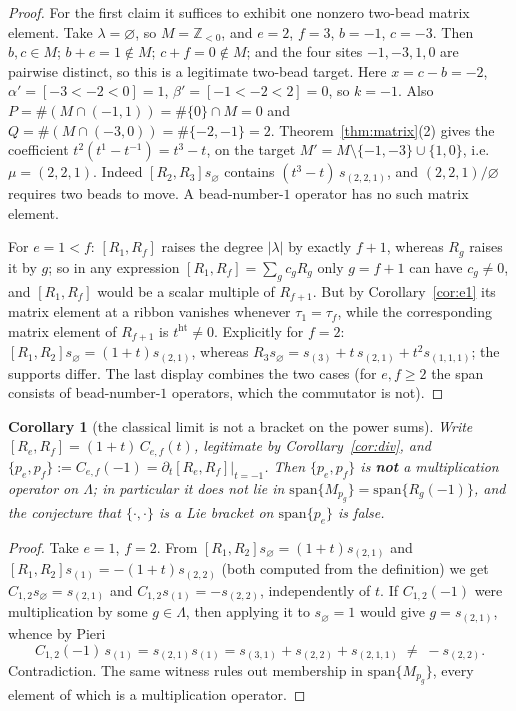 \documentclass[11pt]{article}
\newtheorem{corollary}[theorem]{Corollary}
\theoremstyle{definition}
\newcommand{\hgt}{\operatorname{ht}}          %
\newcommand{\Z}{\mathbb{Z}}
\newcommand{\Lam}{\Lambda}
\newcommand{\Mult}[1]{M_{#1}}
\begin{document}
\begin{proof}
For the first claim it suffices to exhibit one nonzero two-bead matrix element.
Take $\lambda=\varnothing$, so $M=\Z_{<0}$, and $e=2$, $f=3$, $b=-1$, $c=-3$.
Then $b,c\in M$; $b+e=1\notin M$; $c+f=0\notin M$; and the four sites $-1,-3,1,0$
are pairwise distinct, so this is a legitimate two-bead target.  Here $x=c-b=-2$,
$\alpha'=[-3<-2<0]=1$, $\beta'=[-1<-2<2]=0$, so $k=-1$.  Also
$P=\#(M\cap(-1,1))=\#\{0\}\cap M=0$ and $Q=\#(M\cap(-3,0))=\#\{-2,-1\}=2$.
Theorem~\ref{thm:matrix}(2) gives the coefficient $t^{2}(t^{1}-t^{-1})=t^{3}-t$, on the
target $M'=M\setminus\{-1,-3\}\cup\{1,0\}$, i.e.\ $\mu=(2,2,1)$.  Indeed
$[R_2,R_3]s_\varnothing$ contains $(t^{3}-t)\,s_{(2,2,1)}$, and $(2,2,1)/\varnothing$
requires two beads to move.  A bead-number-$1$ operator has no such matrix element.

For $e=1<f$: $[R_1,R_f]$ raises the degree $|\lambda|$ by exactly $f+1$, whereas
$R_g$ raises it by $g$; so in any expression $[R_1,R_f]=\sum_g c_gR_g$ only $g=f+1$ can
have $c_g\ne0$, and $[R_1,R_f]$ would be a scalar multiple of $R_{f+1}$.  But by
Corollary~\ref{cor:e1} its matrix element at a ribbon vanishes whenever
$\tau_1=\tau_f$, while the corresponding matrix element of $R_{f+1}$ is $t^{\hgt}\ne0$.
Explicitly for $f=2$: $[R_1,R_2]s_\varnothing=(1+t)s_{(2,1)}$, whereas
$R_3s_\varnothing=s_{(3)}+t\,s_{(2,1)}+t^{2}s_{(1,1,1)}$; the supports differ.
The last display combines the two cases (for $e,f\ge2$ the span consists of
bead-number-$1$ operators, which the commutator is not).
\end{proof}

\begin{corollary}[the classical limit is not a bracket on the power sums]\label{cor:poisson}
Write $[R_e,R_f]=(1+t)\,C_{e,f}(t)$, legitimate by Corollary~\ref{cor:div}, and
$\{p_e,p_f\}:=C_{e,f}(-1)=\partial_t[R_e,R_f]\big|_{t=-1}$.  Then $\{p_e,p_f\}$ is
\textbf{not} a multiplication operator on $\Lam$; in particular it does not lie in
$\mathrm{span}\{\Mult{p_g}\}=\mathrm{span}\{R_g(-1)\}$, and the conjecture that
$\{\cdot,\cdot\}$ is a Lie bracket on $\mathrm{span}\{p_e\}$ is false.
\end{corollary}

\begin{proof}
Take $e=1$, $f=2$.  From $[R_1,R_2]s_\varnothing=(1+t)s_{(2,1)}$ and
$[R_1,R_2]s_{(1)}=-(1+t)s_{(2,2)}$ (both computed from the definition) we get
$C_{1,2}s_\varnothing=s_{(2,1)}$ and $C_{1,2}s_{(1)}=-s_{(2,2)}$, independently of $t$.
If $C_{1,2}(-1)$ were multiplication by some $g\in\Lam$, then applying it to
$s_\varnothing=1$ would give $g=s_{(2,1)}$, whence by Pieri
\[
 C_{1,2}(-1)\,s_{(1)}=s_{(2,1)}s_{(1)}=s_{(3,1)}+s_{(2,2)}+s_{(2,1,1)}\;\ne\;-s_{(2,2)} .
\]
Contradiction.  The same witness rules out membership in
$\mathrm{span}\{\Mult{p_g}\}$, every element of which is a multiplication operator.
\end{proof}
\end{document}
